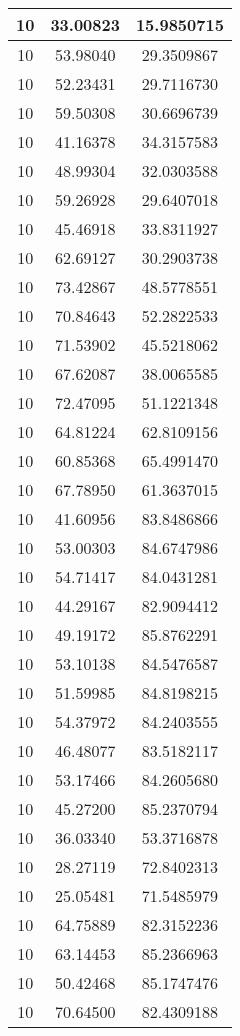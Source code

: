 \documentclass[
]{book}
\begin{document}
\begin{tabular}{c|c|c}
\hline
10 & 33.00823 & 15.9850715\\
\hline
10 & 53.98040 & 29.3509867\\
\hline
10 & 52.23431 & 29.7116730\\
\hline
10 & 59.50308 & 30.6696739\\
\hline
10 & 41.16378 & 34.3157583\\
\hline
10 & 48.99304 & 32.0303588\\
\hline
10 & 59.26928 & 29.6407018\\
\hline
10 & 45.46918 & 33.8311927\\
\hline
10 & 62.69127 & 30.2903738\\
\hline
10 & 73.42867 & 48.5778551\\
\hline
10 & 70.84643 & 52.2822533\\
\hline
10 & 71.53902 & 45.5218062\\
\hline
10 & 67.62087 & 38.0065585\\
\hline
10 & 72.47095 & 51.1221348\\
\hline
10 & 64.81224 & 62.8109156\\
\hline
10 & 60.85368 & 65.4991470\\
\hline
10 & 67.78950 & 61.3637015\\
\hline
10 & 41.60956 & 83.8486866\\
\hline
10 & 53.00303 & 84.6747986\\
\hline
10 & 54.71417 & 84.0431281\\
\hline
10 & 44.29167 & 82.9094412\\
\hline
10 & 49.19172 & 85.8762291\\
\hline
10 & 53.10138 & 84.5476587\\
\hline
10 & 51.59985 & 84.8198215\\
\hline
10 & 54.37972 & 84.2403555\\
\hline
10 & 46.48077 & 83.5182117\\
\hline
10 & 53.17466 & 84.2605680\\
\hline
10 & 45.27200 & 85.2370794\\
\hline
10 & 36.03340 & 53.3716878\\
\hline
10 & 28.27119 & 72.8402313\\
\hline
10 & 25.05481 & 71.5485979\\
\hline
10 & 64.75889 & 82.3152236\\
\hline
10 & 63.14453 & 85.2366963\\
\hline
10 & 50.42468 & 85.1747476\\
\hline
10 & 70.64500 & 82.4309188\\

\end{tabular}
\end{document}
